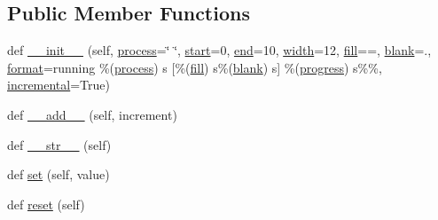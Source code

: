 \subsection*{Public Member Functions}
\begin{DoxyCompactItemize}
\item 
def \hyperlink{classprogressbar_1_1ProgressBar_ad3722b896ddbe5ea96abe5604ac84475}{\+\_\+\+\_\+init\+\_\+\+\_\+} (self, \hyperlink{classprogressbar_1_1ProgressBar_a28ce54371f3a84172049c0520726d2aa}{process}=\char`\"{}     \char`\"{}, \hyperlink{classprogressbar_1_1ProgressBar_a550afef3072c2412e2aa906b12c33bbe}{start}=0, \hyperlink{classprogressbar_1_1ProgressBar_a92053e3baab49364971c15373b6c848f}{end}=10, \hyperlink{classprogressbar_1_1ProgressBar_abde0c8da19e6e6bcde845b1eb3cee279}{width}=12, \hyperlink{classprogressbar_1_1ProgressBar_a6b11796a20118f92eb59abbccf626d23}{fill}=\textquotesingle{}=\textquotesingle{}, \hyperlink{classprogressbar_1_1ProgressBar_a0bfce2d34f0a8f034748d77cc5140bc5}{blank}=\textquotesingle{}.\textquotesingle{}, \hyperlink{classprogressbar_1_1ProgressBar_a4dd00a852851da809ffad5e1bf282858}{format}=\textquotesingle{}running \%(\hyperlink{classprogressbar_1_1ProgressBar_a28ce54371f3a84172049c0520726d2aa}{process}) s \mbox{[}\%(\hyperlink{classprogressbar_1_1ProgressBar_a6b11796a20118f92eb59abbccf626d23}{fill}) s\%(\hyperlink{classprogressbar_1_1ProgressBar_a0bfce2d34f0a8f034748d77cc5140bc5}{blank}) s\mbox{]} \%(\hyperlink{classprogressbar_1_1ProgressBar_a3adc96f42e6891bcd2885c9ef29767f3}{progress}) s\%\%\textquotesingle{}, \hyperlink{classprogressbar_1_1ProgressBar_a0b98b7a8f7025b78a5d01f0dcfc2dbaa}{incremental}=True)
\item 
def \hyperlink{classprogressbar_1_1ProgressBar_ab72aa084f53baad02409c8e7e5979046}{\+\_\+\+\_\+add\+\_\+\+\_\+} (self, increment)
\item 
def \hyperlink{classprogressbar_1_1ProgressBar_aea02b9e37516e9d267e2d48b4e415bd8}{\+\_\+\+\_\+str\+\_\+\+\_\+} (self)
\item 
def \hyperlink{classprogressbar_1_1ProgressBar_a0794442f190ed0d6e5b894f29881758b}{set} (self, value)
\item 
def \hyperlink{classprogressbar_1_1ProgressBar_aefc445915e4d1eb0bbf962857c122dac}{reset} (self)
\end{DoxyCompactItemize}
